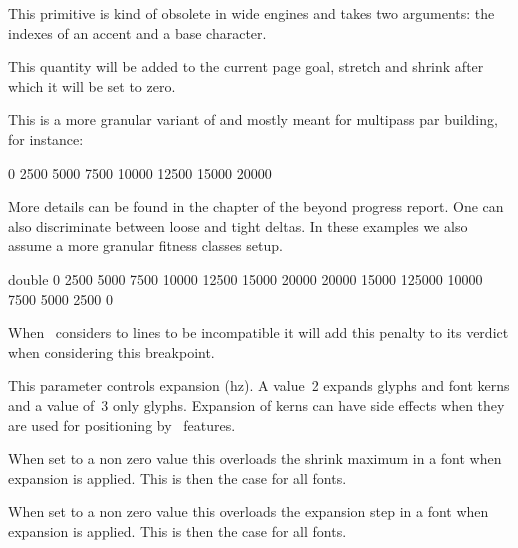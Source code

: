 This primitive is kind of obsolete in wide engines and takes two arguments: the
indexes of an accent and a base character.

\stopoldprimitive

\startnewprimitive[title={\prm {additionalpageskip}}]

This quantity will be added to the current page goal, stretch and shrink after
which it will be set to zero.

\stopnewprimitive

\startnewprimitive[title={\prm {adjacentdemerits}}]

This is a more granular variant of  and mostly meant for multipass
par building, for instance:

\starttyping
{} 0 2500 5000 7500 10000 12500 15000 20000
\stoptyping

More details can be found in the  chapter of the \quote
{beyond} progress report. One can also discriminate between loose and tight
deltas. In these examples we also assume a more granular fitness classes setup.

\starttyping
{} double
        0  2500   5000  7500 10000 12500 15000 20000
    20000 15000 125000 10000 7500   5000  2500     0
\stoptyping

\stopnewprimitive

\startoldprimitive[title={\prm {adjdemerits}}]

When \TEX\ considers to lines to be incompatible it will add this penalty to its
verdict when considering this breakpoint.

\stopoldprimitive

\startnewprimitive[title={\prm {adjustspacing}}]

This parameter controls expansion (hz). A value~2 expands glyphs and font kerns
and a value of~3 only glyphs. Expansion of kerns can have side effects when they
are used for positioning by \OPENTYPE\ features.

\stopnewprimitive

\startnewprimitive[title={\prm {adjustspacingshrink}}]

When set to a non zero value this overloads the shrink maximum in a font when
expansion is applied. This is then the case for all fonts.

\stopnewprimitive

\startnewprimitive[title={\prm {adjustspacingstep}}]

When set to a non zero value this overloads the expansion step in a font when
expansion is applied. This is then the case for all fonts.

